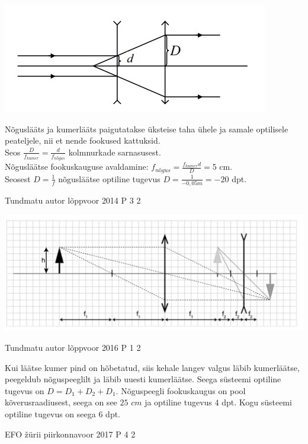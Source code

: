 \documentclass[11pt]{article}
\begin{document}
{{\ifSolution
\begin{center}
	\includegraphics[width=0.5\linewidth]{2013-v2p-05-lah.PNG}
\end{center}
Nõguslääts ja kumerlääts paigutatakse üksteise taha ühele ja samale optilisele peateljele, nii et nende fookused kattuksid. \\
Seos $\frac{D}{f_{kumer}} = \frac{d}{f_{nõgus}}$ kolmnurkade sarnasusest. \\
Nõgusläätse fookuskauguse avaldamine: $f_{nõgus} = \frac{f_{kumer}d}{D} = 5$ cm. \\
Seosest $D = \frac{1}{f}$ nõgusläätse optiline tugevus $D = \frac{1}{-0,05 m} = -20$ dpt. \\
\fi
}


{Tundmatu autor} %
{lõppvoor} %
{2014} %
{P 3} %
{2} %
{

\ifSolution
\begin{center}
	\includegraphics[width=0.5\linewidth]{2014-v3p-03-lah.PNG}
\end{center}
\fi
}
 


{Tundmatu autor} %
{lõppvoor} %
{2016} %
{P 1} %
{2} %
{

\ifSolution
Kui läätse kumer pind on hõbetatud, siis kehale langev valgus läbib kumerläätse, peegeldub nõguspeeglilt ja läbib uuesti kumerläätse. Seega süsteemi optiline tugevus on $D = D_1 + D_2 + D_1$. Nõguspeegli fookuskaugus on pool kõverusraadiusest, seega on see $25$ $cm$ ja optiline tugevus $4$ dpt. Kogu süsteemi optiline tugevus on seega $6$ dpt.
\fi
}


{EFO žürii} %
{piirkonnavoor} %
{2017} %
{P 4} %
{2} %
{

}}
\end{document}
